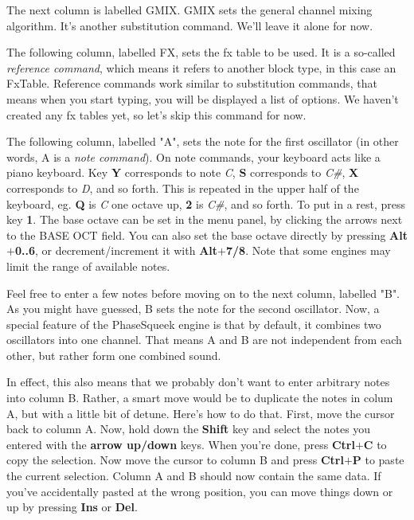 \documentclass[12pt]{report}	%
\begin{document}
The next column is labelled GMIX. GMIX sets the general channel mixing algorithm. It's another substitution command. We'll leave it alone for now.

The following column, labelled FX, sets the fx table to be used. It is a so-called \textit{reference command}, which means it refers to another block type, in this case an FxTable. Reference commands work similar to substitution commands, that means when you start typing, you will be displayed a list of options. We haven't created any fx tables yet, so let's skip this command for now.

The following column, labelled "A", sets the note for the first oscillator (in other words, A is a \textit{note command}). On note commands, your keyboard acts like a piano keyboard. Key \textbf{Y} corresponds to note \textit{C}, \textbf{S} corresponds to \textit{C\#}, \textbf{X} corresponds to \textit{D}, and so forth. This is repeated in the upper half of the keyboard, eg. \textbf{Q} is \textit{C} one octave up, \textbf{2} is \textit{C\#}, and so forth. To put in a rest, press key \textbf{1}. The base octave can be set in the menu panel, by clicking the arrows next to the BASE OCT field. You can also set the base octave directly by pressing \textbf{Alt\(\bm{+}\)0..6}, or decrement/increment it with \textbf{Alt\(\bm{+}\)7/8}. Note that some engines may limit the range of available notes.

Feel free to enter a few notes before moving on to the next column, labelled "B". As you might have guessed, B sets the note for the second oscillator. Now, a special feature of the PhaseSqueek engine is that by default, it combines two oscillators into one channel. That means A and B are not independent from each other, but rather form one combined sound. 

In effect, this also means that we probably don't want to enter arbitrary notes into column B. Rather, a smart move would be to duplicate the notes in colum A, but with a little bit of detune. Here's how to do that. First, move the cursor back to column A. Now, hold down the \textbf{Shift} key and select the notes you entered with the \textbf{arrow up/down} keys. When you're done, press \textbf{Ctrl\(\bm{+}\)C} to copy the selection. Now move the cursor to column B and press \textbf{Ctrl\(\bm{+}\)P} to paste the current selection. Column A and B should now contain the same data. If you've accidentally pasted at the wrong position, you can move things down or up by pressing \textbf{Ins} or \textbf{Del}. 
\end{document}
